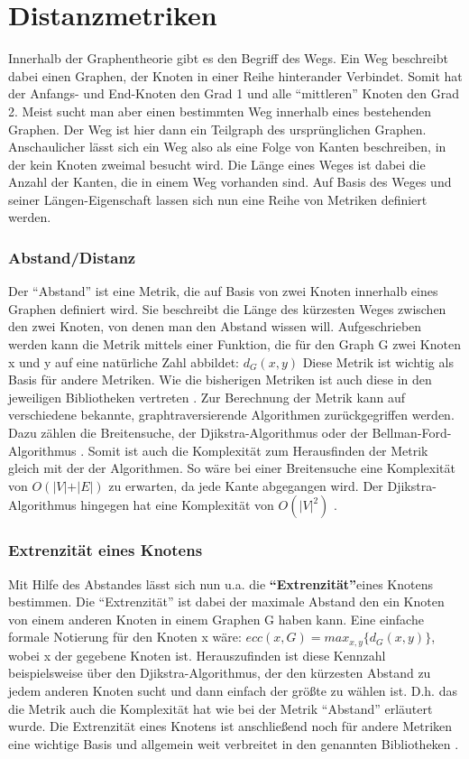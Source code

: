 \documentclass[a4paper,12pt,ngerman,chapterprefix=false,listof=totoc,bibliography=totoc]{scrreprt}
\begin{document}
\section{Distanzmetriken}
{
Innerhalb der Graphentheorie gibt es den Begriff des Wegs. Ein Weg beschreibt dabei einen Graphen, der Knoten in einer Reihe hinterander Verbindet. Somit hat der Anfangs- und End-Knoten den Grad 1 und alle "`mittleren"' Knoten den Grad 2. Meist sucht man aber einen bestimmten Weg innerhalb eines bestehenden Graphen. Der Weg ist hier dann ein Teilgraph des ursprünglichen Graphen. Anschaulicher lässt sich ein Weg also als eine Folge von Kanten beschreiben, in der kein Knoten zweimal besucht wird. Die Länge eines Weges ist dabei die Anzahl der Kanten, die in einem Weg vorhanden sind. \cite{diestel_graphentheorie_2000} Auf Basis des Weges und seiner Längen-Eigenschaft lassen sich nun eine Reihe von Metriken definiert werden.
\subsubsection*{Abstand/Distanz}
{
Der "`Abstand"' ist eine Metrik, die auf Basis von zwei Knoten innerhalb eines Graphen definiert wird. Sie beschreibt die Länge des kürzesten Weges zwischen den zwei Knoten, von denen man den Abstand wissen will. Aufgeschrieben werden kann die Metrik mittels einer Funktion, die für den Graph G zwei Knoten x und y auf eine natürliche Zahl abbildet: \(d_G (x,y)\) \cite{diestel_graphentheorie_2000} Diese Metrik ist wichtig als Basis für andere Metriken. Wie die bisherigen Metriken ist auch diese in den jeweiligen Bibliotheken vertreten \cite{sagemath_graph_2020,matlab_shortest_2020,wolfram_graph_2020}. Zur Berechnung der Metrik kann auf verschiedene bekannte, graphtraversierende Algorithmen zurückgegriffen werden. Dazu zählen die Breitensuche, der Djikstra-Algorithmus oder der Bellman-Ford-Algorithmus \cite{sagemath_graph_2020}. Somit ist auch die Komplexität zum Herausfinden der Metrik gleich mit der der Algorithmen. So wäre bei einer Breitensuche eine Komplexität von \(O(\vert V\vert +\vert E\vert)\) zu erwarten, da jede Kante abgegangen wird. Der Djikstra-Algorithmus hingegen hat eine Komplexität von \(O(\vert V\vert ^2)\) \cite{jungnickel_graphs_2013}.
}
\subsubsection*{Extrenzität eines Knotens}
{
Mit Hilfe des Abstandes lässt sich nun u.a. die \textbf{"`Extrenzität"'}eines Knotens bestimmen. Die "`Extrenzität"' ist dabei der maximale Abstand den ein Knoten von einem anderen Knoten in einem Graphen G haben kann. Eine einfache formale Notierung für den Knoten x wäre: \(ecc(x, G)=max_{x,y}\{d_G(x,y)\}\), wobei x der gegebene Knoten ist. \cite{harary_graph_2001} Herauszufinden ist diese Kennzahl beispielsweise über den Djikstra-Algorithmus, der den kürzesten Abstand zu jedem anderen Knoten sucht und dann einfach der größte zu wählen ist. D.h. das die Metrik auch die Komplexität hat wie bei der Metrik "`Abstand"' erläutert wurde. Die Extrenzität eines Knotens ist anschließend noch für andere Metriken eine wichtige Basis und allgemein weit verbreitet in den genannten Bibliotheken \cite{sagemath_graph_2020,matlab_shortest_2020,wolfram_graph_2020}.
}
}
\end{document}
